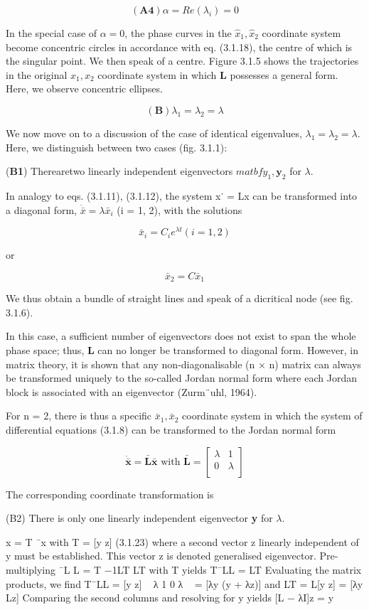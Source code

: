 \documentclass[12pt]{article}
\begin{document}
\[
(\textbf{A4}) \alpha = Re(\lambda_i) = 0
\]

In the special case of $\alpha = 0$, the phase curves in the $\hat{x}_1, \hat{x}_2$ coordinate system
become concentric circles in accordance with eq. (3.1.18), the centre of which is the
singular point. We then speak of a centre. Figure 3.1.5 shows the trajectories in
the original $x_1, x_2$ coordinate system in which \textbf{L} possesses a general form. Here, we
observe concentric ellipses.

\[
(\textbf{B}) \lambda_1 = \lambda_2 = \lambda
\]

We now move on to a discussion of the case of identical eigenvalues, $\lambda_1 = \lambda_2 = \lambda$.
Here, we distinguish between two cases (fig. 3.1.1):

\hfill

(\textbf{B1}) Therearetwo linearly independent eigenvectors $matbf{y}_1, \mathbf{y}_2$ for $\lambda$.

In analogy to eqs. (3.1.11), (3.1.12), the system x˙ = Lx can be transformed into a
diagonal form, $\dot{\bar{x}} = \lambda \bar{x}_i$ (i = 1, 2), with the solutions

\[
\bar{x}_i = C_i e^{\lambda t} (i = 1, 2) 
\]

or

\[
\bar{x}_2 = C \bar{x}_1 
\]


We thus obtain a bundle of straight lines and speak of a dicritical node (see
fig. 3.1.6).

\hfill

In this case, a sufficient number of eigenvectors does not exist to span the whole
phase space; thus, \textbf{L} can no longer be transformed to diagonal form. However, in
matrix theory, it is shown that any non-diagonalisable (n × n) matrix can always
be transformed uniquely to the so-called Jordan normal form where each Jordan
block is associated with an eigenvector (Zurm¨uhl, 1964).

\hfill

For n = 2, there is thus a specific $\bar{x}_1, \bar{x}_2$ coordinate system in which the system of
differential equations (3.1.8) can be transformed to the Jordan normal form


\[
\dot{\bar{\mathbf{x}}} = \mathbf{\bar{L} \bar{x}} \text{ with } \bar{\mathbf{L}} = \begin{bmatrix}
\lambda & 1 \\
0 & \lambda  \\
\end{bmatrix}
\]

The corresponding coordinate transformation is

\hfill

(B2) There is only one linearly independent eigenvector \textbf{y} for $\lambda$.

\hfill

x = T ¯x with T = [y z] (3.1.23)
where a second vector z linearly independent of y must be established. This vector
z is denoted generalised eigenvector. Pre-multiplying
¯L
L = T
−1LT LT
with T yields
T¯LL = LT
Evaluating the matrix products, we find
T¯LL = [y z]
 
λ 1
0 λ
 
= [λy (y + λz)]
and
LT = L[y z] = [λy Lz]
Comparing the second columns and resolving for y yields
[L − λI]z = y
\end{document}
